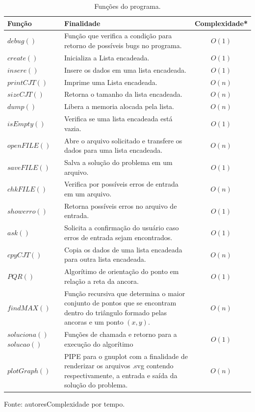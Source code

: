 \documentclass[12pt,a4paper]{article}
\begin{document}
\pagebreak

\begin{table}[!htbp]
	\renewcommand{\arraystretch}{1.8}
	\caption{Funções do programa.}
	\label{tab:funcoes}
	\begin{tabular}{p{2.2cm} p{10cm} c}
		\toprule 
		Função & Finalidade & Complexidade* \\ 
		\midrule
		$debug()$ & Função que verifica a condição para retorno de possíveis bugs no programa. & $O(1)$ \\
		$create()$ & Inicializa a Lista encadeada. & $O(1)$ \\
		$insere()$ & Insere os dados em uma lista encadeada. & $O(1)$ \\
		$printCJT()$ & Imprime uma Lista encadeada. & $O(n)$ \\
		$sizeCJT()$ & Retorna o tamanho da lista encadeada. & $O(n)$ \\
		$dump()$ & Libera a memoria alocada pela lista. & $O(n)$ \\
		$isEmpty()$ & Verifica se uma lista encadeada está vazia. & $O(1)$ \\
		$openFILE()$ & Abre o arquivo solicitado e transfere os dados para uma lista encadeada. & $O(n)$ \\
		$saveFILE()$ & Salva a solução do problema em um arquivo. & $O(1)$ \\
		$chkFILE()$ & Verifica por possíveis erros de entrada em um arquivo. & $O(n)$ \\
		$showerro()$ & Retorna possíveis erros no arquivo de entrada. & $O(1)$ \\
		$ask()$ & Solicita a confirmação do usuário caso erros de entrada sejam encontrados. & $O(1)$ \\
		$cpyCJT()$ & Copia os dados de uma lista encadeada para outra lista encadeada. & $O(n)$ \\
		$PQR()$ & Algorítimo de orientação do ponto em relação a reta da ancora. & $O(1)$ \\
		$findMAX()$ & Função recursiva que determina o maior conjunto de pontos que se encontram dentro do triângulo formado pelas ancoras e um ponto $(x,y)$.  & $O(n)$ \\
		$soluciona()$ $solucao()$ & Funções de chamada e retorno para a execução do algorítimo & $O(1)$ \\
		$plotGraph()$ & PIPE para o gnuplot com a finalidade de renderizar os arquivos .svg contendo respectivamente, a entrada e saída da solução do problema.  & $O(n)$ \\ 
		\bottomrule
	\end{tabular}
	\footnotesize Fonte: autores\hfill *Complexidade por tempo.
\end{table}
\end{document}
